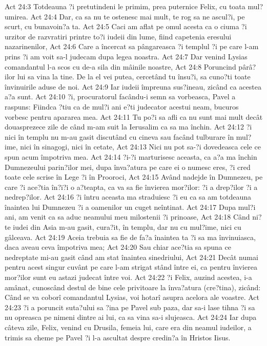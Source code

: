 Act 24:3  Totdeauna ?i pretutindeni le primim, prea puternice Felix, cu toata mul?umirea.
Act 24:4  Dar, ca sa nu te ostenesc mai mult, te rog sa ne ascul?i, pe scurt, cu bunavoin?a ta.
Act 24:5  Caci am aflat pe omul acesta ca o ciuma ?i urzitor de razvratiri printre to?i iudeii din lume, fiind capetenia eresului nazarinenilor,
Act 24:6  Care a încercat sa pângareasca ?i templul ?i pe care l-am prins ?i am voit sa-l judecam dupa legea noastra.
Act 24:7  Dar venind Lysias comandantul l-a scos cu de-a sila din mâinile noastre,
Act 24:8  Poruncind pârâ?ilor lui sa vina la tine. De la el vei putea, cercetând tu însu?i, sa cuno?ti toate învinuirile aduse de noi.
Act 24:9  Iar iudeii împreuna sus?ineau, zicând ca acestea a?a sunt.
Act 24:10  ?i, procuratorul facându-i semn sa vorbeasca, Pavel a raspuns: Fiindca ?tiu ca de mul?i ani e?ti judecator acestui neam, bucuros vorbesc pentru apararea mea.
Act 24:11  Tu po?i sa afli ca nu sunt mai mult decât douasprezece zile de când m-am suit la Ierusalim ca sa ma închin.
Act 24:12  ?i nici în templu nu m-au gasit discutând cu cineva sau facând tulburare în mul?ime, nici în sinagogi, nici în cetate,
Act 24:13  Nici nu pot sa-?i dovedeasca cele ce spun acum împotriva mea.
Act 24:14  ?i-?i marturisesc aceasta, ca a?a ma închin Dumnezeului parin?ilor mei, dupa înva?atura pe care ei o numesc eres, ?i cred toate cele scrise în Lege ?i în Prooroci,
Act 24:15  Având nadejde în Dumnezeu, pe care ?i ace?tia în?i?i o a?teapta, ca va sa fie învierea mor?ilor: ?i a drep?ilor ?i a nedrep?ilor.
Act 24:16  ?i întru aceasta ma straduiesc ?i eu ca sa am totdeauna înaintea lui Dumnezeu ?i a oamenilor un cuget neîntinat.
Act 24:17  Dupa mul?i ani, am venit ca sa aduc neamului meu milostenii ?i prinoase,
Act 24:18  Când ni?te iudei din Asia m-au gasit, cura?it, în templu, dar nu cu mul?ime, nici cu gâlceava.
Act 24:19  Aceia trebuia sa fie de fa?a înaintea ta ?i sa ma învinuiasca, daca aveau ceva împotriva mea;
Act 24:20  Sau chiar ace?tia sa spuna ce nedreptate mi-au gasit când am stat înaintea sinedriului,
Act 24:21  Decât numai pentru acest singur cuvânt pe care l-am strigat stând între ei, ca pentru învierea mor?ilor sunt eu astazi judecat între voi.
Act 24:22  ?i Felix, auzind acestea, i-a amânat, cunoscând destul de bine cele privitoare la înva?atura (cre?tina), zicând: Când se va coborî comandantul Lysias, voi hotarî asupra acelora ale voastre.
Act 24:23  ?i a poruncit suta?ului sa ?ina pe Pavel sub paza, dar sa-i lase tihna ?i sa nu opreasca pe nimeni dintre ai lui, ca sa vina sa-i slujeasca.
Act 24:24  Iar dupa câteva zile, Felix, venind cu Drusila, femeia lui, care era din neamul iudeilor, a trimis sa cheme pe Pavel ?i l-a ascultat despre credin?a în Hristos Iisus.
